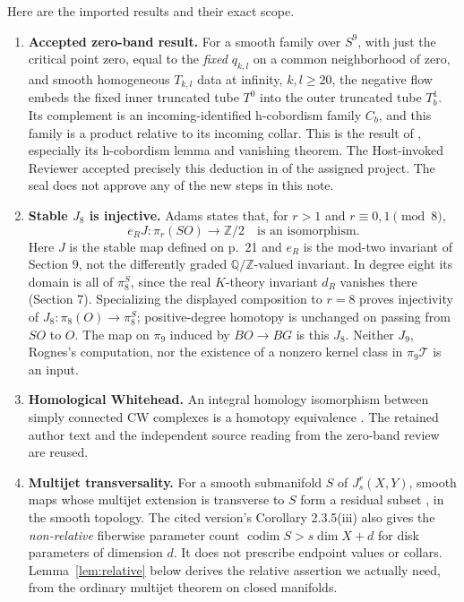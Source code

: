 \documentclass[11pt]{article}
\newcommand{\Z}{\mathbb Z}
\newcommand{\T}{\mathcal T}
\begin{document}
Here are the imported results and their exact scope.
\begin{enumerate}
\item \textbf{Accepted zero-band result.}
For a smooth family over \(S^9\), with just the critical point zero,
equal to the \emph{fixed} \(q_{k,l}\) on a common neighborhood of zero,
and smooth homogeneous \(T_{k,l}\) data at infinity, \(k,l\geq20\),
the negative flow embeds the fixed inner truncated tube \(T^0\) into
the outer truncated tube \(T_b^1\). Its complement is an
incoming-identified h-cobordism family \(C_b\), and this family is a
product relative to its incoming collar.
This is the result of ,
especially its h-cobordism lemma and vanishing theorem.
The Host-invoked Reviewer accepted precisely this deduction in
 of the assigned project.
The seal does not approve any of the new steps in this note.
\item \textbf{Stable \(J_8\) is injective.}
Adams \cite[Theorem 9.5, p.~51]{Adams} states that, for \(r>1\) and
\(r\equiv0,1\pmod8\),
\[
 e_RJ:\pi_r(SO)\longrightarrow\Z/2
 \quad\text{is an isomorphism}.
 \]
Here \(J\) is the stable map defined on p.~21 and \(e_R\) is the
mod-two invariant of Section 9, not the differently graded
\(\mathbb Q/\mathbb Z\)-valued invariant. In degree eight its domain
is all of \(\pi_8^S\), since the real \(K\)-theory invariant \(d_R\)
vanishes there (Section 7).
Specializing the displayed composition to \(r=8\) proves injectivity
of \(J_8:\pi_8(O)\to\pi_8^S\); positive-degree homotopy is unchanged
on passing from \(SO\) to \(O\).
The map on \(\pi_9\) induced by \(BO\to BG\) is this \(J_8\).
Neither \(J_9\), Rognes's computation, nor the existence of a nonzero
kernel class in \(\pi_9\T\) is an input.
\item \textbf{Homological Whitehead.}
An integral homology isomorphism between simply connected CW
complexes is a homotopy equivalence
\cite[Corollary 4.33]{Hatcher}. The retained author text and the
independent source reading from the zero-band review are reused.
\item \textbf{Multijet transversality.}
For a smooth submanifold \(S\) of \(J_s^r(X,Y)\), smooth maps whose
multijet extension is transverse to \(S\) form a residual subset
\cite[Theorem 2.3.4]{BPT}, in the smooth topology.
The cited version's Corollary 2.3.5(iii) also gives the
\emph{non-relative} fiberwise parameter count
\(\operatorname{codim}S>s\dim X+d\) for disk parameters of
dimension \(d\).
It does not prescribe endpoint values or collars.
Lemma~\ref{lem:relative} below derives the relative assertion we
actually need, from the ordinary multijet theorem on closed manifolds.
\end{enumerate}
\end{document}

